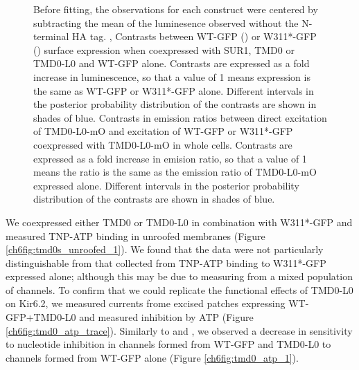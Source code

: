 \begin{figure}[h]
{	Before fitting, the observations for each construct were centered by subtracting the mean of the luminesence observed without the N-terminal HA tag.
	,  Contrasts between WT-GFP () or W311*-GFP () surface expression when coexpressed with SUR1, TMD0 or TMD0-L0 and WT-GFP alone.
	Contrasts are expressed as a fold increase in luminescence, so that a value of 1 means expression is the same as WT-GFP or W311*-GFP alone.
	Different intervals in the posterior probability distribution of the contrasts are shown in shades of blue.
	  Contrasts in emission ratios between direct excitation of TMD0-L0-mO and excitation of WT-GFP or W311*-GFP coexpressed with TMD0-L0-mO in whole cells.
	Contrasts are expressed as a fold increase in emision ratio, so that a value of 1 means the ratio is the same as the emission ratio of TMD0-L0-mO expressed alone.
	Different intervals in the posterior probability distribution of the contrasts are shown in shades of blue.
	}\label{ch6fig:tmd0_assays}
\end{figure}

We coexpressed either TMD0 or TMD0-L0 in combination with W311*-GFP and measured TNP-ATP binding in unroofed membranes (Figure \ref{ch6fig:tmd0s_unroofed_1}).
We found that the data were not particularly distinguishable from that collected from TNP-ATP binding to W311*-GFP expressed alone; although this may be due to measuring from a mixed population of channels.
To confirm that we could replicate the functional effects of TMD0-L0 on Kir6.2, we measured currents frome excised patches expressing WT-GFP+TMD0-L0 and measured inhibition by ATP (Figure \ref{ch6fig:tmd0_atp_trace}).
Similarly to \citeauthor{babenko_sur_2003-1} and \citeauthor{chan_n-terminal_2003-1}, we observed a decrease in sensitivity to nucleotide inhibition in channels formed from WT-GFP and TMD0-L0 to channels formed from WT-GFP alone (Figure \ref{ch6fig:tmd0_atp_1}).

